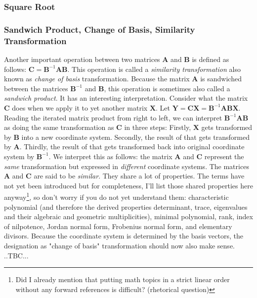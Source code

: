 \subsubsection{Square Root}



\subsubsection{Sandwich Product, Change of Basis, Similarity Transformation}
Another important operation between two matrices $\mathbf{A}$ and $\mathbf{B}$ is defined as follows: $\mathbf{C} = \mathbf{B}^{-1} \mathbf{A} \mathbf{B}$. This operation is called a \emph{similarity transformation} also known as \emph{change of basis} transformation. Because the matrix $\mathbf{A}$ is sandwiched between the matrices $\mathbf{B}^{-1}$ and $\mathbf{B}$, this operation is sometimes also called a \emph{sandwich product}. It has an interesting interpretation. Consider what the matrix $\mathbf{C}$ does when we apply it to yet another matrix $\mathbf{X}$. Let $\mathbf{Y} = \mathbf{C X} = \mathbf{B}^{-1} \mathbf{A B X}$. Reading the iterated matrix product from right to left, we can interpret $\mathbf{B}^{-1} \mathbf{A} \mathbf{B}$ as doing the same transformation as $\mathbf{C}$ in three steps: Firstly, $\mathbf{X}$ gets transformed by $\mathbf{B}$ into a new coordinate system. Secondly, the result of that gets transformed by $\mathbf{A}$. Thirdly, the result of that gets transformed back into original coordinate system by $\mathbf{B}^{-1}$. We interpret this as follows: the matrix $\mathbf{A}$ and $\mathbf{C}$ represent the \emph{same} transformation but expressed in \emph{different} coordinate systems. The matrices $\mathbf{A}$ and $\mathbf{C}$ are said to be \emph{similar}. They share a lot of properties. The terms have not yet been introduced but for completeness, I'll list those shared properties here anyway\footnote{Did I already mention that putting math topics in a strict linear order without any forward references is difficult? (rhetorical question)}, so don't worry if you do not yet understand them: characteristic polynomial (and therefore the derived properties determinant, trace, eigenvalues and their algebraic and geometric multiplicities), minimal polynomial, rank, index of nilpotence, Jordan normal form, Frobenius normal form, and elementary divisors. Because the coordinate system is determined by the basis vectors, the designation as "change of basis" transformation should now also make sense. 
..TBC...

